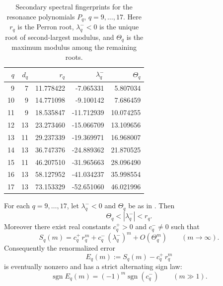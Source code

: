 \begin{table}[t]
\centering
\scriptsize
\setlength{\tabcolsep}{5pt}
\caption{Secondary spectral fingerprints for the resonance polynomials
\(P_q\), \(q=9,\dots,17\).  Here \(r_q\) is the Perron root, \(\lambda_q^-<0\)
is the unique root of second-largest modulus, and \(\Theta_q\) is the maximum
modulus among the remaining roots.}
\label{tab:secondary-spectral-q9-17}
\begin{tabular}{r r r r r}
\toprule
\(q\) & \(d_q\) & \(r_q\) & \(\lambda_q^-\) & \(\Theta_q\) \\
\midrule
9  & 7  & 11.778422 & -7.065331  & 5.807034 \\
10 & 9  & 14.771098 & -9.100142  & 7.686459 \\
11 & 9  & 18.535847 & -11.712939 & 10.074255 \\
12 & 13 & 23.273460 & -15.066709 & 13.109656 \\
13 & 11 & 29.237339 & -19.369971 & 16.968007 \\
14 & 13 & 36.747376 & -24.889362 & 21.870525 \\
15 & 11 & 46.207510 & -31.965663 & 28.096490 \\
16 & 13 & 58.127952 & -41.034237 & 35.998554 \\
17 & 13 & 73.153329 & -52.651060 & 46.021996 \\
\bottomrule
\end{tabular}
\end{table}

\begin{theorem}
\label{thm:alternating-second-order}
For each \(q=9,\dots,17\), let \(\lambda_q^-<0\) and \(\Theta_q\) be as in
.  Then
\[
  \Theta_q<|\lambda_q^-|<r_q.
\]
Moreover there exist real constants \(c_q^+>0\) and \(c_q^-\neq 0\) such that
\[
  S_q(m)=c_q^+\,r_q^m+c_q^-\,(\lambda_q^-)^m+O(\Theta_q^m)
  \qquad (m\to\infty).
\]
Consequently the renormalized error
\[
  E_q(m):=S_q(m)-c_q^+\,r_q^m
\]
is eventually nonzero and has a strict alternating sign law:
\[
  \operatorname{sgn} E_q(m)=(-1)^m\operatorname{sgn}(c_q^-)
  \qquad (m\gg 1).
\]
\end{theorem}

